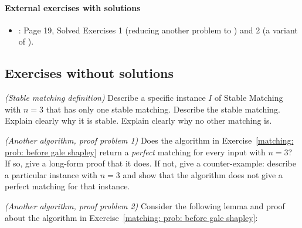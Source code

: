 \documentclass[11pt]{article}
\begin{document}
\paragraph{External exercises with solutions}

\begin{itemize}

\item \KT:
  Page 19, Solved Exercises 1 (reducing another problem to )
  and 2 (a variant of ).

\end{itemize}

\subsection{Exercises without solutions}

\exercise\emph{(Stable matching definition)}
Describe a specific instance $I$ of Stable Matching with $n=3$
that has only one stable matching.
Describe the stable matching. Explain clearly why it is stable.
Explain clearly why no other matching is.


\exercise\emph{(Another algorithm, proof problem 1)}
Does the algorithm in Exercise~\ref{matching: prob: before gale shapley}
return a \emph{perfect} matching for every input with $n=3$?
If so, give a long-form proof that it does.
If not, give a counter-example: describe a particular  instance with $n=3$
and show that the algorithm does not give a perfect matching for that instance.


\exercise\emph{(Another algorithm, proof problem 2)}
  Consider the following lemma and proof about the algorithm in Exercise~\ref{matching: prob: before gale shapley}:
  
\end{document}
